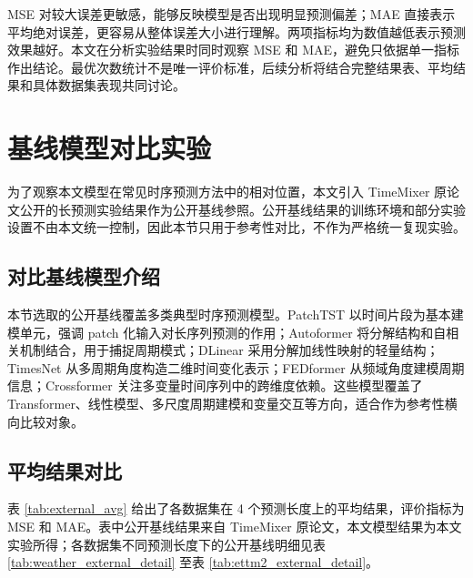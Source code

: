 MSE 对较大误差更敏感，能够反映模型是否出现明显预测偏差；MAE 直接表示平均绝对误差，更容易从整体误差大小进行理解。两项指标均为数值越低表示预测效果越好。本文在分析实验结果时同时观察 MSE 和 MAE，避免只依据单一指标作出结论。最优次数统计不是唯一评价标准，后续分析将结合完整结果表、平均结果和具体数据集表现共同讨论。

\section{基线模型对比实验}

为了观察本文模型在常见时序预测方法中的相对位置，本文引入 TimeMixer 原论文公开的长预测实验结果作为公开基线参照。公开基线结果的训练环境和部分实验设置不由本文统一控制，因此本节只用于参考性对比，不作为严格统一复现实验。

\subsection{对比基线模型介绍}

本节选取的公开基线覆盖多类典型时序预测模型。PatchTST\cite{nie2023time} 以时间片段为基本建模单元，强调 patch 化输入对长序列预测的作用；Autoformer\cite{wu2021autoformer} 将分解结构和自相关机制结合，用于捕捉周期模式；DLinear\cite{zeng2023transformers} 采用分解加线性映射的轻量结构；TimesNet\cite{wu2023timesnet} 从多周期角度构造二维时间变化表示；FEDformer\cite{zhou2022fedformer} 从频域角度建模周期信息；Crossformer\cite{zhang2023crossformer} 关注多变量时间序列中的跨维度依赖。这些模型覆盖了 Transformer、线性模型、多尺度周期建模和变量交互等方向，适合作为参考性横向比较对象。

\subsection{平均结果对比}

表 \ref{tab:external_avg} 给出了各数据集在 4 个预测长度上的平均结果，评价指标为 MSE 和 MAE。表中公开基线结果来自 TimeMixer 原论文，本文模型结果为本文实验所得；各数据集不同预测长度下的公开基线明细见表 \ref{tab:weather_external_detail} 至表 \ref{tab:ettm2_external_detail}。

